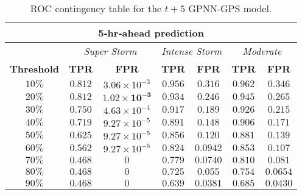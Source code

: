\begin{table}[ht]
	\centering
	\caption{ROC contingency table for the $t+5$ GPNN-GPS model.}
	\label{table:rocgpnn5h}
	\begin{tabular}
		{c| c c | c c | c c}
		\hline
		\multicolumn{7}{c}{\textbf{5‐hr‐ahead prediction}} \\ 
		\hline
		 & \multicolumn{2}{c}{\textit{Super Storm}} & \multicolumn{2}{c}{\textit{Intense Storm}} & \multicolumn{2}{c}{\textit{Moderate}} \\ 
		\hline
		\textbf{Threshold} & \textbf{TPR} & \textbf{FPR} & \textbf{TPR} & \textbf{FPR} & \textbf{TPR} & \textbf{FPR} \\ 
		\hline
		$ 10\%$ & $ 0.812 $ & $3.06\times10^{-3}$ & $ 0.956 $ & $ 0.316 $ & $ 0.962 $ & $0.346$ \\ 
		$ 20\%$ & $\mathbf{0.812}$ & $\mathbf{1.02\times10^{-3}}$ & $ 0.934 $ & $ 0.246 $ & $ 0.945 $ & $0.265$ \\ 
		$ 30\%$ & $ 0.750 $ & $4.63\times10^{-4}$ & $ 0.917 $ & $ 0.189 $ & $ 0.926 $ & $0.215$ \\ 
		$ 40\%$ & $ 0.719 $ & $9.27\times10^{-5}$ & $ 0.891 $ & $ 0.148 $ & $ 0.906 $ & $0.171$ \\ 
		$ 50\%$ & $ 0.625 $ & $9.27\times10^{-5}$ & $\mathbf{0.856}$ & $\mathbf{0.120}$ & $ 0.881 $ & $0.139$ \\ 
		$ 60\%$ & $ 0.562 $ & $9.27\times10^{-5}$ & $ 0.824 $ & $ 0.0942 $ & $\mathbf{0.853}$ & $\mathbf{0.107}$ \\ 
		$ 70\%$ & $ 0.468 $ & $ 0 $ & $ 0.779 $ & $ 0.0740 $ & $ 0.810 $ & $0.081$ \\ 
		$ 80\%$ & $ 0.468 $ & $ 0 $ & $ 0.725 $ & $ 0.055 $ & $ 0.754 $ & $0.0654$ \\ 
		$ 90\%$ & $ 0.468 $ & $ 0 $ & $ 0.639 $ & $ 0.0381 $ & $ 0.685 $ & $0.0430$\\
		\hline
	\end{tabular}
\end{table}

